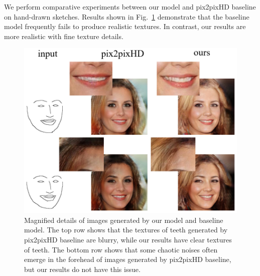 \documentclass[10pt,twocolumn,letterpaper]{article}
\begin{document}
We perform comparative experiments between our model and pix2pixHD baseline on hand-drawn sketches.
Results shown in Fig.~\ref{fig:compare_1} demonstrate that the baseline model frequently fails to produce realistic textures. 
In contrast, our results are more realistic with fine texture details.  
\begin{figure}[htb]
	\centering
	\includegraphics[width=0.45 \textwidth]{texture.png}
	\caption{Magnified details of images generated by our model and baseline model. The top row shows that the textures of teeth generated by pix2pixHD baseline are blurry, while our results have clear textures of teeth. The bottom row shows that some chaotic noises often emerge in the forehead of images generated by pix2pixHD baseline, but our results do not have this issue.}
	\label{fig:compare_1}
\end{figure}
\end{document}
